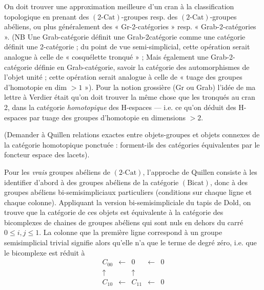 \documentclass[11pt,a4paper]{article}
\begin{document}
On doit trouver une approximation meilleure d'un cran à la classification
topologique en prenant des $(2\text{-Cat})$-groupes resp. des
$(2\text{-Cat})$-groupes abéliens, ou plus généralement des
« Gr-2-catégories » resp. « Grab-2-catégories ». (NB Une Grab-catégorie
définit une Grab-2catégorie comme une catégorie définit une 2-catégorie ;
du point de vue semi-simplicial, cette opération serait analogue à celle de
« cosquélette tronqué » ; Mais également une Grab-2-catégorie définie en
Grab-catégorie, savoir la catégorie des automorphismes de l'objet unité ;
cette opération serait analogue à celle de « tuage des groupes d'homotopie
en dim $> 1$ »). Pour la notion grossière (Gr ou Grab) l'idée de ma
lettre à Verdier était qu'on doit trouver la même chose que les tronqués
au cran 2, dans la catégorie \emph{homotopique} des H-espaces — i.e.
ce qu'on déduit des H-espaces par tuage des groupes d'homotopie en
dimensions $> 2$.

(Demander à Quillen relations exactes entre objets-groupes et objets
connexes de la catégorie homotopique ponctuée : forment-ils des
catégories équivalentes par le foncteur espace des lacets).

Pour les \emph{vrais} groupes abéliens de $(2\text{-Cat})$,
l'approche de Quillen consiste à les identifier d'abord à des groupes
abéliens de la catégorie $(\mathrm{Bicat})$, donc à des groupes abéliens
bi-semisimpliciaux particuliers (conditions sur chaque ligne et chaque
colonne). Appliquant la version bi-semisimpliciale du tapis de Dold, on
trouve que la catégorie de ces objets est équivalente à la catégorie des
bicomplexes de chaines de groupes abéliens qui sont nuls en dehors du
carré $0 \leq i, j \leq 1$. La colonne que la première ligne correspond à
un groupe semisimplicial trivial signifie alors qu'elle n'a que le terme de
degré zéro, i.e. que le bicomplexe est réduit à
\[
\begin{array}{ccccc}
C_{00} & \longleftarrow & 0 & \longleftarrow & 0 \\
\uparrow & & \uparrow & & \\
C_{10} & \longleftarrow & C_{11} & \longleftarrow & 0
\end{array}
\]
\end{document}
